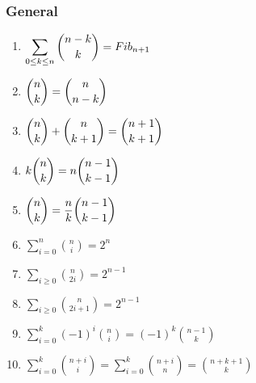 \begin{enumerate}

            \end{enumerate}
\subsubsection{General}\begin{enumerate}

            \item $\displaystyle \displaystyle \sum \limits_{0\leq k \leq n} {n-k \choose k} = Fib_{n+1}$
            \item $\displaystyle \displaystyle {n \choose k}={n \choose n-k}$
            \item $\displaystyle \displaystyle {n \choose k}+{n \choose k+1}={n+1 \choose k+1}$
            \item $\displaystyle \displaystyle k{n \choose k}=n{n-1 \choose k-1}$
            \item $\displaystyle \displaystyle {n \choose k}=\frac{n}{k}{n-1 \choose k-1}$
            \item $\displaystyle \sum \limits_{i=0}^n{n \choose i}=2^n$
            \item $\displaystyle \sum \limits_{i\geq 0}{n \choose 2i}=2^{n-1}$
            \item $\displaystyle \sum \limits_{i\geq 0}{n \choose 2i+1}=2^{n-1}$
            \item $\displaystyle \sum \limits_{i= 0}^k \left( -1 \right) ^i{n \choose i}=\left( -1 \right) ^k{n-1 \choose
                k}$
            
            \item $\displaystyle \sum \limits_{i= 0}^k{n+i \choose i}= \sum \limits_{i= 0}^k{n+i \choose n} = {n+k+1
                \choose
                k}$
            

\end{enumerate}
